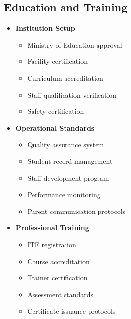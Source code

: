 \subsection{Education and Training}\label{subsec:education-compliance}
\vspace{1em}

\begin{tcolorbox}[
    colback=white,
    colframe=primarydark,
    title=\textbf{Education Sector Requirements},
    before skip=1em,
    after skip=1em
]
    \begin{itemize}[leftmargin=*,itemsep=0.5em]
        \item \textbf{Institution Setup}
        \begin{itemize}[itemsep=0.3em]
            \item Ministry of Education approval
            \item Facility certification
            \item Curriculum accreditation
            \item Staff qualification verification
            \item Safety certification
        \end{itemize}

        \vspace{0.5em}

        \item \textbf{Operational Standards}
        \begin{itemize}[itemsep=0.3em]
            \item Quality assurance system
            \item Student record management
            \item Staff development program
            \item Performance monitoring
            \item Parent communication protocols
        \end{itemize}

        \vspace{0.5em}

        \item \textbf{Professional Training}
        \begin{itemize}[itemsep=0.3em]
            \item ITF registration
            \item Course accreditation
            \item Trainer certification
            \item Assessment standards
            \item Certificate issuance protocols
        \end{itemize}
    \end{itemize}
\end{tcolorbox}

